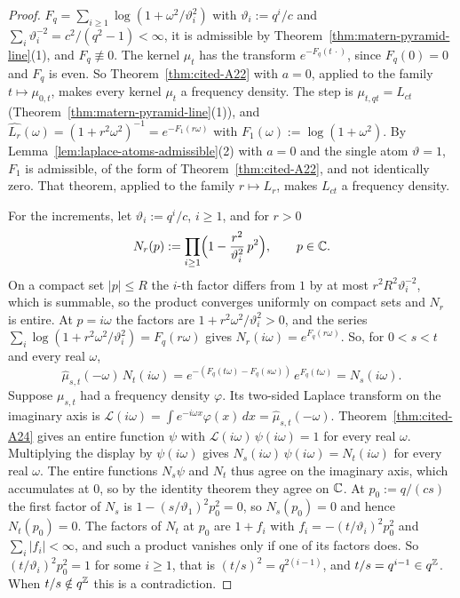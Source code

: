 \begin{proof}
\leanok
$F_q = \sum_{i \ge 1}\log(1 + \omega^2/\vartheta_i^2)$ with $\vartheta_i := q^i/c$ and
$\sum_i\vartheta_i^{-2} = c^2/(q^2 - 1) < \infty$, it is admissible by
Theorem~\ref{thm:matern-pyramid-line}(1), and $F_q \not\equiv 0$. The kernel $\mu_t$ has the
transform $e^{-F_q(t\,\cdot)}$, since $F_q(0) = 0$ and $F_q$ is even. So
Theorem~\ref{thm:cited-A22} with $a = 0$, applied
to the family $t \mapsto \mu_{0,t}$, makes every kernel $\mu_t$ a \Polya{} frequency density. The
step is $\mu_{t,qt} = L_{ct}$ (Theorem~\ref{thm:matern-pyramid-line}(1)), and
$\widehat{L_r}(\omega) = (1 + r^2\omega^2)^{-1} = e^{-F_1(r\omega)}$ with
$F_1(\omega) := \log(1 + \omega^2)$. By Lemma~\ref{lem:laplace-atoms-admissible}(2) with $a = 0$
and the single atom $\vartheta = 1$, $F_1$ is admissible, of the form of
Theorem~\ref{thm:cited-A22}, and not identically zero. That theorem, applied to the family
$r \mapsto L_r$, makes $L_{ct}$ a \Polya{} frequency density.

For the increments, let $\vartheta_i := q^i/c$, $i \ge 1$, and for $r > 0$
\[
  N_r(p) := \prod_{i \ge 1}\Bigl(1 - \frac{r^2}{\vartheta_i^2}\,p^2\Bigr), \qquad p \in \mathbb{C} .
\]
On a compact set $|p| \le R$ the $i$-th factor differs from $1$ by at most $r^2R^2\vartheta_i^{-2}$,
which is summable, so the product converges uniformly on compact sets and $N_r$ is entire. At
$p = i\omega$ the factors are $1 + r^2\omega^2/\vartheta_i^2 > 0$, and the series
$\sum_i\log(1 + r^2\omega^2/\vartheta_i^2) = F_q(r\omega)$ gives $N_r(i\omega) = e^{F_q(r\omega)}$.
So, for $0 < s < t$ and every real $\omega$,
\[
  \widehat\mu_{s,t}(-\omega)\,N_t(i\omega) = e^{-(F_q(t\omega) - F_q(s\omega))}\,e^{F_q(t\omega)}
  = N_s(i\omega).
\]
Suppose $\mu_{s,t}$ had a \Polya{} frequency density $\varphi$. Its two-sided Laplace transform
on the imaginary axis is $\mathcal{L}(i\omega) = \int e^{-i\omega x}\varphi(x)\,dx =
\widehat\mu_{s,t}(-\omega)$. Theorem~\ref{thm:cited-A24} gives an entire function $\psi$ with
$\mathcal{L}(i\omega)\,\psi(i\omega) = 1$ for every real $\omega$. Multiplying the display by
$\psi(i\omega)$ gives $N_s(i\omega)\,\psi(i\omega) = N_t(i\omega)$ for every real $\omega$. The
entire functions $N_s\psi$ and $N_t$ thus agree on the imaginary axis, which accumulates at $0$,
so by the identity theorem they agree on $\mathbb{C}$. At $p_0 := q/(cs)$ the first factor of $N_s$ is
$1 - (s/\vartheta_1)^2p_0^2 = 0$, so $N_s(p_0) = 0$ and hence $N_t(p_0) = 0$. The factors of $N_t$
at $p_0$ are $1 + f_i$ with $f_i = -(t/\vartheta_i)^2p_0^2$ and $\sum_i|f_i| < \infty$, and such a
product vanishes only if one of its factors does. So $(t/\vartheta_i)^2p_0^2 = 1$ for some
$i \ge 1$, that is $(t/s)^2 = q^{2(i-1)}$, and $t/s = q^{i-1} \in q^{\mathbb{Z}}$. When
$t/s \notin q^{\mathbb{Z}}$ this is a contradiction.
\end{proof}


